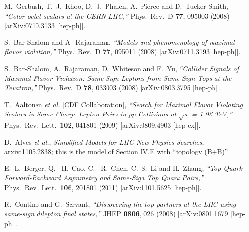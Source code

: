 \begin{thebibliography}{99}
  M.~Gerbush, T.~J.~Khoo, D.~J.~Phalen, A.~Pierce and D.~Tucker-Smith,
  {\it ``Color-octet scalars at the CERN LHC,''}
  Phys.\ Rev.\ D {\bf 77}, 095003 (2008)
  [arXiv:0710.3133 [hep-ph]].




  S.~Bar-Shalom and A.~Rajaraman,
  {\it ``Models and phenomenology of maximal flavor violation,''}
  Phys.\ Rev.\ D {\bf 77}, 095011 (2008)
  [arXiv:0711.3193 [hep-ph]].

  S.~Bar-Shalom, A.~Rajaraman, D.~Whiteson and F.~Yu,
  {\it ``Collider Signals of Maximal Flavor Violation: 
	Same-Sign Leptons from Same-Sign Tops at the Tevatron,''}
  Phys.\ Rev.\ D {\bf 78}, 033003 (2008)
  [arXiv:0803.3795 [hep-ph]].

  T.~Aaltonen {\it et al.}  [CDF Collaboration],
  {\it ``Search for Maximal Flavor Violating Scalars in 
	Same-Charge Lepton Pairs in $p \bar{p}$ Collisions at $\sqrt{s}$ = 1.96-TeV,''}
  Phys.\ Rev.\ Lett.\  {\bf 102}, 041801 (2009)
  [arXiv:0809.4903 [hep-ex]].

 D.~Alves {\it et al.}, {\it Simplified Models for LHC New
Physics Searches}, arxiv:1105.2838; this is the model of Section IV.E
with ``topology (B+B)''. 




  E.~L.~Berger, Q.~-H.~Cao, C.~-R.~Chen, C.~S.~Li and H.~Zhang,
  {\it ``Top Quark Forward-Backward Asymmetry and Same-Sign Top Quark Pairs,''}
  Phys.\ Rev.\ Lett.\  {\bf 106}, 201801 (2011)
  [arXiv:1101.5625 [hep-ph]].


  R.~Contino and G.~Servant,
  {\it ``Discovering the top partners at the LHC using same-sign dilepton final states,''}
  JHEP {\bf 0806}, 026 (2008)
  [arXiv:0801.1679 [hep-ph]].



\end{thebibliography}
